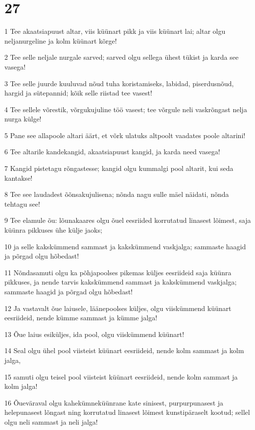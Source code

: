 \chapter{27}

\par 1 Tee akaatsiapuust altar, viis küünart pikk ja viis küünart lai; altar olgu neljanurgeline ja kolm küünart kõrge!
\par 2 Tee selle neljale nurgale sarved; sarved olgu sellega ühest tükist ja karda see vasega!
\par 3 Tee selle juurde kuuluvad nõud tuha koristamiseks, labidad, piserdusnõud, hargid ja sütepannid; kõik selle riistad tee vasest!
\par 4 Tee sellele võrestik, võrgukujuline töö vasest; tee võrgule neli vaskrõngast nelja nurga külge!
\par 5 Pane see allapoole altari äärt, et võrk ulatuks altpoolt vaadates poole altarini!
\par 6 Tee altarile kandekangid, akaatsiapuust kangid, ja karda need vasega!
\par 7 Kangid pistetagu rõngastesse; kangid olgu kummalgi pool altarit, kui seda kantakse!
\par 8 Tee see laudadest õõnsakujulisena; nõnda nagu sulle mäel näidati, nõnda tehtagu see!
\par 9 Tee elamule õu: lõunakaares olgu õuel eesriided korrutatud linasest lõimest, saja küünra pikkuses ühe külje jaoks;
\par 10 ja selle kakskümmend sammast ja kakskümmend vaskjalga; sammaste haagid ja põrgad olgu hõbedast!
\par 11 Nõndasamuti olgu ka põhjapoolses pikemas küljes eesriideid saja küünra pikkuses, ja nende tarvis kakskümmend sammast ja kakskümmend vaskjalga; sammaste haagid ja põrgad olgu hõbedast!
\par 12 Ja vastavalt õue laiusele, läänepoolses küljes, olgu viiskümmend küünart eesriideid, nende kümme sammast ja kümme jalga!
\par 13 Õue laius esiküljes, ida pool, olgu viiskümmend küünart!
\par 14 Seal olgu ühel pool viisteist küünart eesriideid, nende kolm sammast ja kolm jalga,
\par 15 samuti olgu teisel pool viisteist küünart eesriideid, nende kolm sammast ja kolm jalga!
\par 16 Õueväraval olgu kahekümneküünrane kate sinisest, purpurpunasest ja helepunasest lõngast ning korrutatud linasest lõimest kunstipäraselt kootud; sellel olgu neli sammast ja neli jalga!
